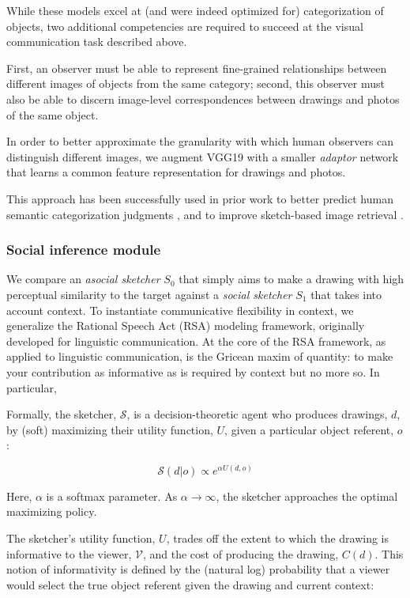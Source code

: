 \documentclass[9pt,twocolumn,twoside]{pnas-new}
\begin{document}
While these models excel at (and were indeed optimized for) categorization of objects, two additional competencies are required to succeed at the visual communication task described above.

First, an observer must be able to represent fine-grained relationships between different images of objects from the same category; second, this observer must also be able to discern image-level correspondences between drawings and photos of the same object. 

In order to better approximate the granularity with which human observers can distinguish different images, we augment VGG19 with a smaller \textit{adaptor} network that learns a common feature representation for drawings and photos. 

This approach has been successfully used in prior work to better predict human semantic categorization judgments \cite{peterson2016adapting}, and to improve sketch-based image retrieval \cite[]{sangkloy2016sketchy}. 


\subsubsection*{Social inference module}

We compare an \emph{asocial sketcher} $S_0$ that simply aims to make a drawing with high perceptual similarity to the target against a \emph{social sketcher} $S_1$ that takes into account context. To instantiate communicative flexibility in context, we generalize the Rational Speech Act (RSA) modeling framework, originally developed for linguistic communication. At the core of the RSA framework, as applied to linguistic communication, is the Gricean maxim of quantity: to make your contribution as informative as is required by context but no more so. In particular, 

Formally, the sketcher, $\mathcal{S}$, is a decision-theoretic agent who produces drawings, $d$, by (soft) maximizing their utility function, $U$, given a particular object referent, $o$: 

\begin{equation}
\mathcal{S}(d|o) \propto e^{\alpha U(d,o)}
\end{equation}

Here, $\alpha$ is a softmax parameter. As $\alpha \rightarrow \infty$, the sketcher approaches the optimal maximizing policy. 

The sketcher's utility function, $U$, trades off the extent to which the drawing is informative to the viewer, $\mathcal{V}$, and the cost of producing the drawing, $C(d)$. This notion of informativity is defined by the (natural log) probability that a viewer would select the true object referent given the drawing and current context:
\end{document}
